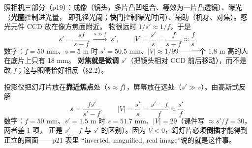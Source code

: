 ﻿\documentclass[11pt]{ctexart}
\renewcommand{\flowerrule}{\par\vspace{2pt}\noindent\makebox[\linewidth]{\color{petal}\rule{0.22\linewidth}{0.6pt}\hspace{8pt}{\small\ding{95}}\hspace{4pt}\raisebox{1.1pt}{\tiny\ding{95}}\hspace{4pt}{\small\ding{95}}\hspace{8pt}\rule{0.22\linewidth}{0.6pt}}\par\vspace{2pt}}
\begin{document}
\flowerrule



照相机三部分（p19）：成像（镜头，多片凸凹组合、等效为一片凸透镜）、曝光（\textbf{光圈}控制进光量，
即孔径光阑；\textbf{快门}控制曝光时间）、辅助（机身、对焦）。感光元件 CCD 放在像方焦面附近。
物很远时 $1/s'\approx1/f$，于是
\[
s'=\frac{sf}{s-f}\;\xrightarrow{\,s\gg f\,}\;s',
\qquad |V|=\frac{s'}{s}=\frac{f}{s-f}\approx\frac{f}{s}.
\]
数字：$f=50$ mm、$s=5$ m 时 $s'=50.5$ mm、$|V|\approx1/99$——一个 1.8 m 高的人在底片上只有 18 mm。
\textbf{对焦就是微调 $s'$}（把镜头相对 CCD 前后移动），而不是改 $f$；这与眼睛恰好相反（§2.2）。



投影仪把幻灯片放在\textbf{靠近焦点}处（$s\approx f$），屏幕放在远处（$s'\gg s$）。由高斯式反解
\[
s=\frac{fs'}{s'-f},\qquad
|V|=\frac{s'}{s}=\frac{s'-f}{f}\approx\frac{s'}{f}.
\]
数字：$f=50$ mm、$s'=1.5$ m 时 $s=51.7$ mm、$|V|=29$（课件写 $\approx s'/f=30$，两者差 1 项，
正是 $s'-f$ 与 $s'$ 的区别）。因为 $V<0$，幻灯片必须\textbf{倒插}才能得到正立的画面——p21 表里
“inverted, magnified, real image”说的就是这件事。
\end{document}

